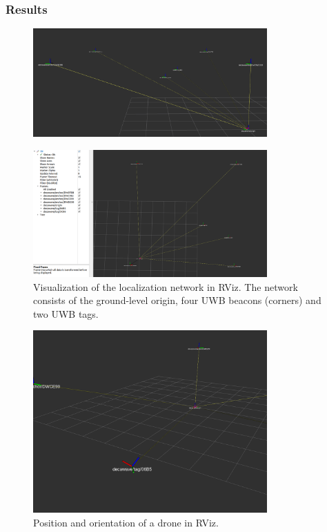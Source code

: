 \documentclass[12pt]{article}
\begin{document}
\subsubsection*{Results}
\begin{figure}[h]
    \centering
    \includegraphics[width=0.8\textwidth]{figures/image1.png}
    \label{fig:frames2}
\end{figure}
\begin{figure}[h]
    \centering
    \includegraphics[width=0.8\textwidth]{figures/image.png}
    \caption{Visualization of the localization network in RViz. The network consists of the ground-level origin, four UWB beacons (corners) and two UWB tags.}
    \label{fig:frames1}
\end{figure}
\begin{figure}[h]
    \centering
    \includegraphics[width=0.8\textwidth]{figures/image2.png}
    \caption{Position and orientation of a drone in RViz.}
    \label{fig:frames2}
\end{figure}

 
\end{document}
